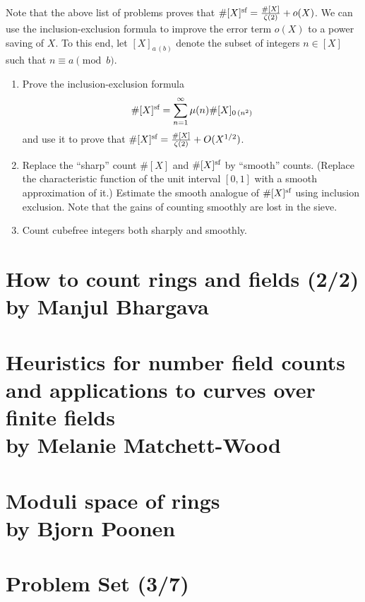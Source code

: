 \documentclass[12pt,amsfont]{amsart}
\begin{document}
Note that the above list of problems proves that
$\#[X]^\sf=\frac{\#[X]}{\zeta(2)}+o(X)$. We can use the
inclusion-exclusion formula to improve the error term $o(X)$ to a
power saving of $X$. To this end, let $[X]_{a\,(b)}$ denote the subset
of integers $n\in[X]$ such that $n\equiv a\pmod{b}$.
\begin{enumerate}
\item Prove the inclusion-exclusion formula
$$
\#[X]^\sf=\sum_{n=1}^\infty \mu(n)\#[X]_{0\,(n^2)}
$$
and use it to prove that
$\#[X]^\sf=\frac{\#[X]}{\zeta(2)}+O(X^{1/2})$.
\item Replace the ``sharp'' count $\#[X]$ and $\#[X]^\sf$ by
  ``smooth'' counts. (Replace the characteristic function of the unit
  interval $[0,1]$ with a smooth approximation of it.) Estimate the
  smooth analogue of $\#[X]^\sf$ using inclusion exclusion. Note that
  the gains of counting smoothly are lost in the sieve.
\item Count cubefree integers both sharply and smoothly.
\end{enumerate}

\newpage
\section{How to count rings and fields (2/2)\\ by Manjul Bhargava}\label{16}

\begingroup
\renewcommand{\addcontentsline}[3]{}%
\endgroup


\newpage
\renewcommand{\thesubsection}{\arabic{section}.\arabic{subsection}}
\section{Heuristics for number field counts and applications to curves over finite fields\\ by Melanie Matchett-Wood}\label{17}


\newpage
\renewcommand{\thesubsection}{\arabic{section}.\arabic{subsection}}
\section{Moduli space of rings\\ by Bjorn Poonen}\label{18}

\newpage
\renewcommand{\thesubsection}{\arabic{section}.\arabic{subsection}}
\section{Problem Set (3/7)}\label{19}
\end{document}
